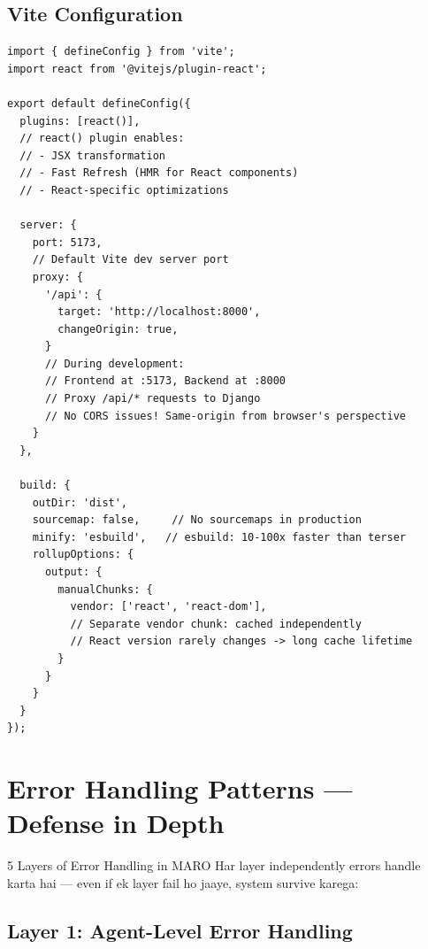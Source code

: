 \documentclass[11pt,a4paper,twoside]{report}
\begin{document}
\section{Vite Configuration}

\begin{lstlisting}[style=jsstyle,caption={vite.config.js --- Build Configuration}]
import { defineConfig } from 'vite';
import react from '@vitejs/plugin-react';

export default defineConfig({
  plugins: [react()],
  // react() plugin enables:
  // - JSX transformation
  // - Fast Refresh (HMR for React components)
  // - React-specific optimizations

  server: {
    port: 5173,
    // Default Vite dev server port
    proxy: {
      '/api': {
        target: 'http://localhost:8000',
        changeOrigin: true,
      }
      // During development:
      // Frontend at :5173, Backend at :8000
      // Proxy /api/* requests to Django
      // No CORS issues! Same-origin from browser's perspective
    }
  },

  build: {
    outDir: 'dist',
    sourcemap: false,     // No sourcemaps in production
    minify: 'esbuild',   // esbuild: 10-100x faster than terser
    rollupOptions: {
      output: {
        manualChunks: {
          vendor: ['react', 'react-dom'],
          // Separate vendor chunk: cached independently
          // React version rarely changes -> long cache lifetime
        }
      }
    }
  }
});
\end{lstlisting}



\chapter{Error Handling Patterns --- Defense in Depth}

\begin{conceptbox}{5 Layers of Error Handling in MARO}
Har layer independently errors handle karta hai --- even if ek layer fail ho jaaye, system survive karega:
\end{conceptbox}

\section{Layer 1: Agent-Level Error Handling}
\end{document}
